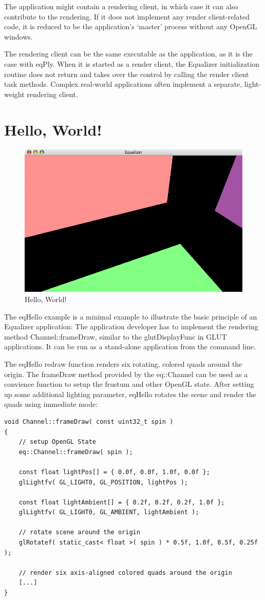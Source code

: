 \documentclass[10pt,a4]{scrartcl}
\begin{document}
The application might contain a rendering client, in which case it can 
also contribute to the rendering. If it does not implement any render
client-related code, it is reduced to be the application's `master'
process without any OpenGL windows.

The rendering client can be the same executable as the application, as
it is the case with \textsf{eqPly}. When it is started as a render client,
the Equalizer initialization routine does not return and takes over the
control by calling the render client task methods. Complex real-world
applications often implement a separate, light-weight rendering client.


\section{Hello, World!}

\begin{figure}
  \includegraphics[width=.6\textwidth]{images/eqHello.png}
  {\caption{\small\label{fHello}Hello, World!}}
\end{figure}

The \textsf{eqHello} example is a minimal example to illustrate the
basic principle of an Equalizer application: The application developer
has to implement the rendering method \textsf{Channel::frameDraw},
similar to the \textsf{glutDisplayFunc} in GLUT applications. It can be
run as a stand-alone application from the command line.

The \textsf{eqHello} redraw function renders six rotating, colored quads
around the origin. The \textsf{frameDraw} meth\-od provided by the
\textsf{eq::Channel} can be used as a convience function to setup the
frustum and other OpenGL state. After setting up some additional
lighting parameter, \textsf{eqHello} rotates the scene and render the
quads using immediate mode:

{\footnotesize\begin{lstlisting}
void Channel::frameDraw( const uint32_t spin )
{
    // setup OpenGL State
    eq::Channel::frameDraw( spin );
    
    const float lightPos[] = { 0.0f, 0.0f, 1.0f, 0.0f };
    glLightfv( GL_LIGHT0, GL_POSITION, lightPos );

    const float lightAmbient[] = { 0.2f, 0.2f, 0.2f, 1.0f };
    glLightfv( GL_LIGHT0, GL_AMBIENT, lightAmbient );

    // rotate scene around the origin
    glRotatef( static_cast< float >( spin ) * 0.5f, 1.0f, 0.5f, 0.25f );

    // render six axis-aligned colored quads around the origin
    [...]
}
\end{lstlisting}}
\end{document}
